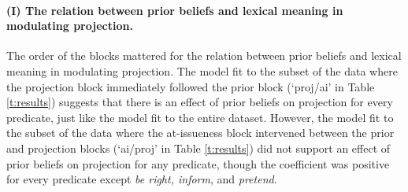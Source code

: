 \documentclass[11pt,fleqn]{article}
\newcommand{\6}{\mbox{$[\hspace*{-.6mm}[$}}
\newcommand{\9}{\mbox{$]\hspace*{-.6mm}]$}}
\begin{document}
%
%
%
%


\paragraph{(I) The relation between prior beliefs and lexical meaning in modulating projection.} The order of the blocks mattered for the relation between prior beliefs and lexical meaning in modulating projection. The model fit to the subset of the data where the projection block immediately followed the prior block (`proj/ai' in Table \ref{t:results}) suggests that there is an effect of prior beliefs on projection for every predicate, just like the model fit to the entire dataset.  However, the model fit to the subset of the data where the at-issueness block intervened between the prior and projection blocks (`ai/proj' in Table \ref{t:results}) did not support an effect of prior beliefs on projection for any predicate, though the coefficient was positive for every predicate except {\em be right, inform}, and {\em pretend}. 
\end{document}
